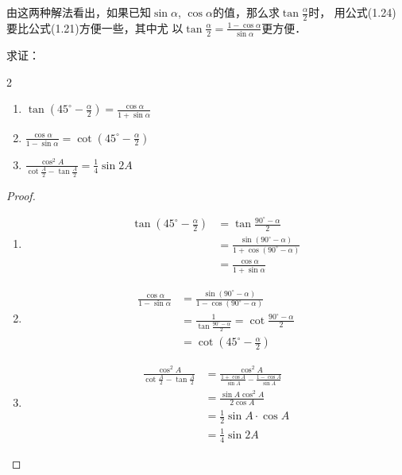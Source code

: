 由这两种解法看出，如果已知$\sin\alpha$, $\cos\alpha$的值，那么求$\tan\frac{\alpha}{2}$时，
用公式(1.24)要比公式(1.21)方便一些，其中尤
以$\tan\frac{\alpha}{2}=\frac{1-\cos\alpha}{\sin\alpha}$更方便．

\begin{example}
    求证：
\begin{multicols}{2}
    \begin{enumerate}
    \item $\tan\left(45^{\circ}-\frac{\alpha}{2}\right)=\frac{\cos\alpha}{1+\sin\alpha}$
    \item $\frac{\cos\alpha}{1-\sin\alpha}=\cot \left(45^{\circ}-\frac{\alpha}{2}\right)$
    \item $\frac{\cos^2 A}{\cot\frac{A}{2}-\tan\frac{A}{2}}=\frac{1}{4}\sin 2A$
\end{enumerate}
\end{multicols}
\end{example}

\begin{proof}
\begin{enumerate}
    \item \[\begin{split}
\tan\left(45^{\circ}-\frac{\alpha}{2}\right) &=\tan\frac{90^{\circ}-\alpha}{2}\\ 
&=\frac{\sin(90^{\circ}-\alpha)}{1+\cos(90^{\circ}-\alpha)}\\
&=\frac{\cos\alpha}{1+\sin\alpha}
    \end{split}\]

    \item \[\begin{split}
        \frac{\cos\alpha}{1-\sin\alpha}&= \frac{\sin(90^{\circ}-\alpha)}{1-\cos(90^{\circ}-\alpha)}\\
        &=\frac{1}{\tan\frac{90^{\circ}-\alpha}{2}}=\cot\frac{90^{\circ}-\alpha}{2}\\
&=\cot\left(45^{\circ}-\frac{\alpha}{2}\right)
    \end{split}\]

    \item \[\begin{split}
\frac{\cos^2 A}{\cot\frac{A}{2}-\tan\frac{A}{2}}&=\frac{\cos^2 A}{\frac{1+\cos A}{\sin A}-\frac{1-\cos A}{\sin A}}\\        
&=\frac{\sin A\cos^2 A}{2\cos A}\\
&=\frac{1}{2}\sin A\cdot \cos A\\
&=\frac{1}{4}\sin 2A
    \end{split}\]
\end{enumerate}    
\end{proof}

